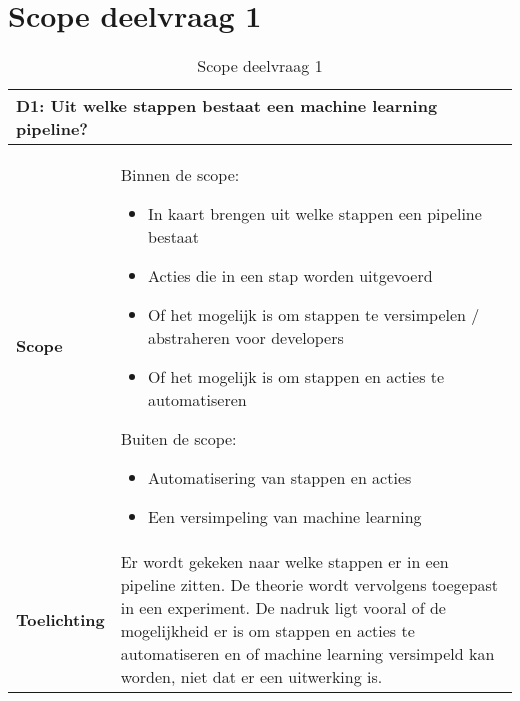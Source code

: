 \section{Scope deelvraag 1}\label{appendix:scope-subquestion-1}
\begin{table}[hbt!]
  \centering
  \begin{tabular}{|p{.215\linewidth}|p{.72\linewidth}|}
  \hline
  \multicolumn{2}{|p{.97\linewidth}|}{\textbf{D1: Uit welke stappen bestaat een machine learning pipeline?}} \\ \hline
    \textbf{Scope}&
      Binnen de scope:
      \begin{itemize}
        \item In kaart brengen uit welke stappen een pipeline bestaat
        \item Acties die in een stap worden uitgevoerd
        \item Of het mogelijk is om stappen te versimpelen / abstraheren voor developers
        \item Of het mogelijk is om stappen en acties te automatiseren
      \end{itemize}
      Buiten de scope:
      \begin{itemize}
        \item Automatisering van stappen en acties
        \item Een versimpeling van machine learning
      \end{itemize}
    \\ \hline
    \textbf{Toelichting}&
      Er wordt gekeken naar welke stappen er in een pipeline zitten. De theorie wordt vervolgens toegepast in een experiment. De nadruk ligt vooral of de mogelijkheid er is om stappen en acties te automatiseren en of machine learning versimpeld kan worden, niet dat er een uitwerking is.
    \\ \hline
  \end{tabular}
  \caption{Scope deelvraag 1}
  \label{table:scope-subquestion-1}
\end{table}

\newpage

